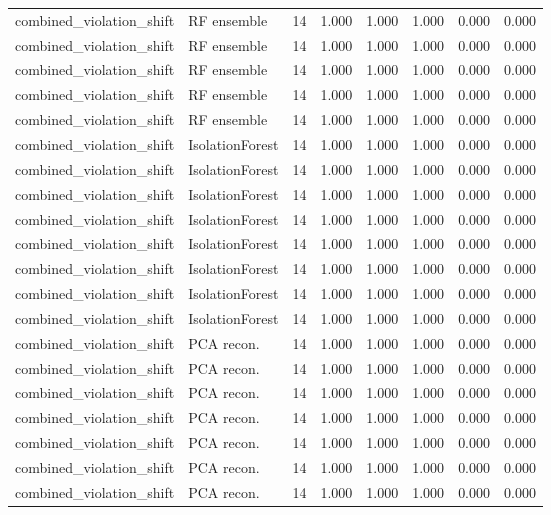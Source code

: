{\begin{longtable}{llrrrrrr}
combined\_violation\_shift & RF ensemble & 14 & 1.000 & 1.000 & 1.000 & 0.000 & 0.000 \\
combined\_violation\_shift & RF ensemble & 14 & 1.000 & 1.000 & 1.000 & 0.000 & 0.000 \\
combined\_violation\_shift & RF ensemble & 14 & 1.000 & 1.000 & 1.000 & 0.000 & 0.000 \\
combined\_violation\_shift & RF ensemble & 14 & 1.000 & 1.000 & 1.000 & 0.000 & 0.000 \\
combined\_violation\_shift & RF ensemble & 14 & 1.000 & 1.000 & 1.000 & 0.000 & 0.000 \\
combined\_violation\_shift & IsolationForest & 14 & 1.000 & 1.000 & 1.000 & 0.000 & 0.000 \\
combined\_violation\_shift & IsolationForest & 14 & 1.000 & 1.000 & 1.000 & 0.000 & 0.000 \\
combined\_violation\_shift & IsolationForest & 14 & 1.000 & 1.000 & 1.000 & 0.000 & 0.000 \\
combined\_violation\_shift & IsolationForest & 14 & 1.000 & 1.000 & 1.000 & 0.000 & 0.000 \\
combined\_violation\_shift & IsolationForest & 14 & 1.000 & 1.000 & 1.000 & 0.000 & 0.000 \\
combined\_violation\_shift & IsolationForest & 14 & 1.000 & 1.000 & 1.000 & 0.000 & 0.000 \\
combined\_violation\_shift & IsolationForest & 14 & 1.000 & 1.000 & 1.000 & 0.000 & 0.000 \\
combined\_violation\_shift & IsolationForest & 14 & 1.000 & 1.000 & 1.000 & 0.000 & 0.000 \\
combined\_violation\_shift & PCA recon. & 14 & 1.000 & 1.000 & 1.000 & 0.000 & 0.000 \\
combined\_violation\_shift & PCA recon. & 14 & 1.000 & 1.000 & 1.000 & 0.000 & 0.000 \\
combined\_violation\_shift & PCA recon. & 14 & 1.000 & 1.000 & 1.000 & 0.000 & 0.000 \\
combined\_violation\_shift & PCA recon. & 14 & 1.000 & 1.000 & 1.000 & 0.000 & 0.000 \\
combined\_violation\_shift & PCA recon. & 14 & 1.000 & 1.000 & 1.000 & 0.000 & 0.000 \\
combined\_violation\_shift & PCA recon. & 14 & 1.000 & 1.000 & 1.000 & 0.000 & 0.000 \\
combined\_violation\_shift & PCA recon. & 14 & 1.000 & 1.000 & 1.000 & 0.000 & 0.000 \\

\end{longtable}}
